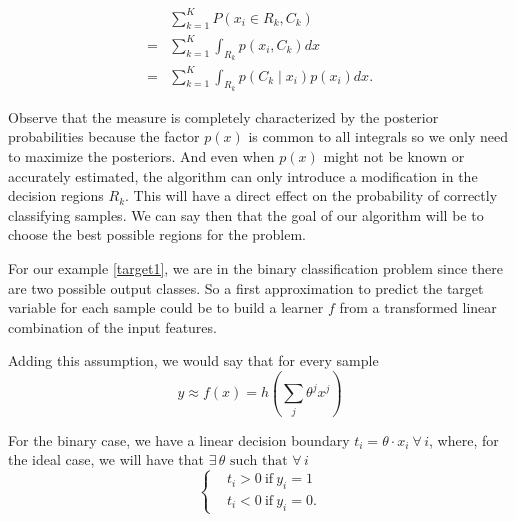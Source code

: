 \begin{equation}\label{eq:goodclassification-equation}
\begin{split}
  & \sum_{k=1}^{K} P(x_i \in R_k, C_k ) \\
= & \sum_{k=1}^{K} \int_{R_k}p(x_i,C_k) dx \\
= & \sum_{k=1}^{K} \int_{R_k}p(C_k \mid x_i) p(x_i) dx .
\end{split}
\end{equation}

Observe that the measure is completely characterized by the posterior probabilities because the factor $p(x)$ is common to all integrals so we only need to maximize the posteriors.
And even when $p(x)$ might not be known or accurately estimated, the algorithm can only introduce a modification in the decision regions $R_k$.
This will have a direct effect on the probability of correctly classifying samples.
We can say then that the goal of our algorithm will be to choose the best possible regions for the problem.

For our example \cref{target1}, we are in the binary classification problem since there are two possible output classes.
So a first approximation to predict the target variable for each sample could be to build a learner $f$ from a transformed linear combination of the input features.


Adding this assumption, we would say that for every sample
\begin{equation}
y \approx f(x) = h\left(\sum_{j}\theta^j x^j\right)  \label{formula:1}
\end{equation}
%

For the binary case, we have a linear decision boundary $ t_i = \theta \cdot x_i \ \forall \, i $, where, for the ideal case, we will have that $\exists \, \theta \mbox{ such that } \forall \, i $
\begin{equation}
\begin{cases}
& t_i >0 \ \mbox{if} \ y_i=1 \\
& t_i <0 \ \mbox{if} \ y_i=0.
\end{cases}
\end{equation}


